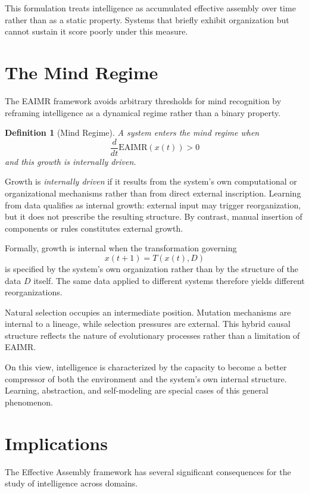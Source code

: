 \documentclass[11pt,letterpaper]{article}
\newtheorem{definition}{Definition}
\begin{document}
This formulation treats intelligence as accumulated effective assembly over time rather than as a static property. Systems that briefly exhibit organization but cannot sustain it score poorly under this measure.

\section{The Mind Regime}

The EAIMR framework avoids arbitrary thresholds for mind recognition by reframing intelligence as a dynamical regime rather than a binary property.

\begin{definition}[Mind Regime]
A system enters the \emph{mind regime} when
\[
\frac{d}{dt}\mathrm{EAIMR}(x(t)) > 0
\]
and this growth is internally driven.
\end{definition}

Growth is \emph{internally driven} if it results from the system’s own computational or organizational mechanisms rather than from direct external inscription. Learning from data qualifies as internal growth: external input may trigger reorganization, but it does not prescribe the resulting structure. By contrast, manual insertion of components or rules constitutes external growth.

Formally, growth is internal when the transformation governing
\[
x(t+1) = T(x(t), D)
\]
is specified by the system’s own organization rather than by the structure of the data $D$ itself. The same data applied to different systems therefore yields different reorganizations.

Natural selection occupies an intermediate position. Mutation mechanisms are internal to a lineage, while selection pressures are external. This hybrid causal structure reflects the nature of evolutionary processes rather than a limitation of EAIMR.

On this view, intelligence is characterized by the capacity to become a better compressor of both the environment and the system’s own internal structure. Learning, abstraction, and self-modeling are special cases of this general phenomenon.

\section{Implications}

The Effective Assembly framework has several significant consequences for the study of intelligence across domains.
\end{document}
